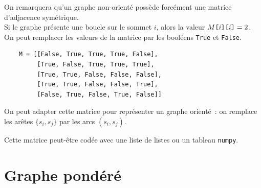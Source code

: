 On remarquera qu'un graphe non-orienté possède forcément une matrice d'adjacence symétrique.\\
Si le graphe présente une boucle sur le sommet $i$, alors la valeur $M\verb![!i\verb!]!\verb![!i\verb!]!=2$.\\

On peut remplacer les valeurs de la matrice par les booléens \texttt{True} et \texttt{False}.

\begin{Verbatim}
    M = [[False, True, True, True, False],
         [True, False, True, True, True],
         [True, True, False, False, False],
         [True, True, False, False, True],
         [False, True, False, True, False]]
\end{Verbatim}

On peut adapter cette matrice pour représenter un graphe orienté~: on remplace les arêtes $\{s_i, s_j\}$ par les arcs $(s_i, s_j)$. 

Cette matrice peut-être codée avec une liste de listes ou un tableau \texttt{numpy}.
%
%
%




\section{Graphe pondéré}

